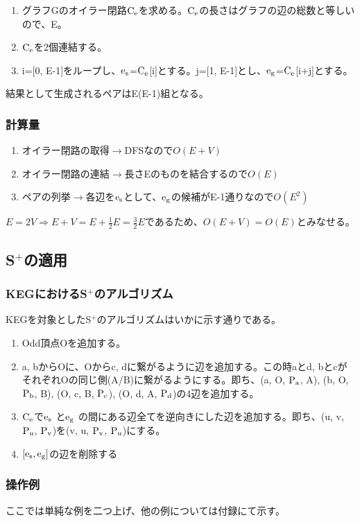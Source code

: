\documentclass[11pt,a4j]{jarticle}
\newcommand{\splus}{S${}^\text{+}$}
\newcommand{\f}[1]{$\rm{#1}$} %
\newcommand{\ra }{$\rightarrow$}
\begin{document}
\begin{enumerate}
    \item グラフGのオイラー閉路\f{C_e}を求める。\f{C_e}の長さはグラフの辺の総数と等しいので、E。
    \item \f{C_e}を2個連結する。
    \item i=[0, E-1]をループし、\f{e_s}=\f{C_e}[i]とする。j=[1, E-1]とし、\f{e_g}=\f{C_e}[i+j]とする。
\end{enumerate}

結果として生成されるペアはE(E-1)組となる。

\subsubsection{計算量}
\begin{enumerate}
    \item オイラー閉路の取得\ra DFSなので$O(E+V)$
    \item オイラー閉路の連結\ra 長さEのものを結合するので$O(E)$
    \item ペアの列挙\ra 各辺を\f{e_s}として、\f{e_g}の候補がE-1通りなので$O(E^2)$
\end{enumerate}
$E=2V \Rightarrow E+V=E+\frac{1}{2}E=\frac{3}{2}E$であるため、$O(E+V)=O(E)$とみなせる。

\subsection{\splus の適用}

\subsubsection{KEGにおける\splus のアルゴリズム}
KEGを対象とした\splus のアルゴリズムはいかに示す通りである。
\begin{enumerate}
    \item Odd頂点Oを追加する。
    \item a, bからOに、Oからc, dに繋がるように辺を追加する。この時aとd, bとcがそれぞれOの同じ側(A/B)に繋がるようにする。即ち、(a, O, \f{P_a}, A), (b, O, \f{P_b}, B), (O, c, B, \f{P_c}), (O, d, A, \f{P_d})の4辺を追加する。
    \item \f{C_e}で\f{e_s} と\f{e_g} の間にある辺全てを逆向きにした辺を追加する。即ち、(u, v, \f{P_u}, \f{P_v})を(v, u, \f{P_v}, \f{P_u})にする。
    \item $[\rm{e_s}, \rm{e_g}]$の辺を削除する
\end{enumerate}

\subsubsection{操作例}
ここでは単純な例を二つ上げ、他の例については付録にて示す。
\end{document}
